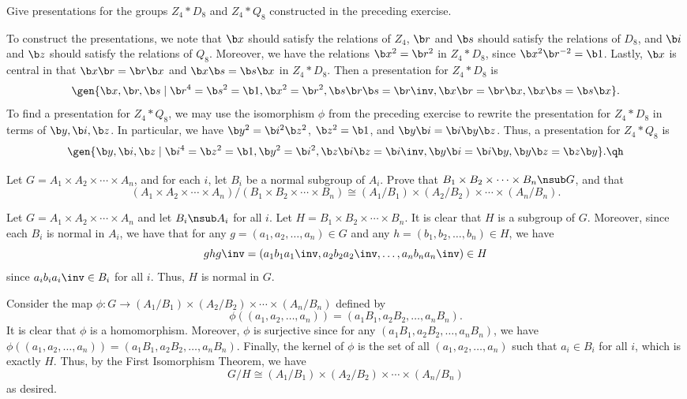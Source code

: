 \begin{exercise}\label{ex5.1.13}
    Give presentations for the groups $Z_4 * D_8$ and $Z_4 * Q_8$ constructed in the preceding exercise.
\end{exercise}

\begin{sol}
    To construct the presentations, we note that $\b x$ should satisfy the relations of $Z_4$, $\b r$ and $\b s$ should satisfy the relations of $D_8$, and $\b i$ and $\b z$ should satisfy the relations of $Q_8$. Moreover, we have the relations $\b x^2 = \b r^2$ in $Z_4 * D_8$, since $\b x^2\b r^{-2} = \b 1$. Lastly, $\b x$ is central in that $\b x \b r = \b r\b x$ and $\b x\b s = \b s\b x$ in $Z_4 * D_8$. Then a presentation for $Z_4 * D_8$ is
    \[\gen{\b x, \b r, \b s \mid \b r^4 = \b s^2 = \b 1, \b x^2 = \b r^2, \b s\b r\b s = \b r\inv, \b x\b r = \b r\b x, \b x\b s = \b s\b x}.\]
    To find a presentation for $Z_4 * Q_8$, we may use the isomorphism $\phi$ from the preceding exercise to rewrite the presentation for $Z_4 * D_8$ in terms of $\b y, \b i, \b z$. In particular, we have $\b y^2 = \b i^2\b z^2$, $\b z^2 = \b 1$, and $\b y\b i = \b i\b y\b z$. Thus, a presentation for $Z_4 * Q_8$ is
    \[\gen{\b y, \b i, \b z \mid \b i^4 = \b z^2 = \b 1, \b y^2 = \b i^2, \b z\b i \b z = \b i\inv, \b y\b i = \b i\b y, \b y\b z = \b z\b y}. \qh\]
\end{sol}

\begin{exercise}\label{ex5.1.14}
    Let $G = A_1 \times A_2 \times \cdots \times A_n$, and for each $i$, let $B_i$ be a normal subgroup of $A_i$. Prove that $B_1 \times B_2 \times \cdots \times B_n \nsub G$, and that
    \[(A_1 \times A_2 \times \cdots \times A_n)/(B_1 \times B_2 \times \cdots \times B_n) \cong (A_1/B_1) \times (A_2/B_2) \times \cdots \times (A_n/B_n).\]
\end{exercise}

\begin{sol}
    Let $G = A_1 \times A_2 \times \cdots \times A_n$ and let $B_i \nsub A_i$ for all $i$. Let $H = B_1 \times B_2 \times \cdots \times B_n$. It is clear that $H$ is a subgroup of $G$. Moreover, since each $B_i$ is normal in $A_i$, we have that for any $g = (a_1, a_2, \ldots, a_n) \in G$ and any $h = (b_1, b_2, \ldots, b_n) \in H$, we have
    \[ghg\inv = (a_1b_1a_1\inv, a_2b_2a_2\inv, \ldots, a_nb_na_n\inv) \in H\]
    since $a_ib_ia_i\inv \in B_i$ for all $i$. Thus, $H$ is normal in $G$.

    Consider the map $\phi : G \to (A_1/B_1) \times (A_2/B_2) \times \cdots \times (A_n/B_n)$ defined by
    \[\phi((a_1, a_2, \ldots, a_n)) = (a_1B_1, a_2B_2, \ldots, a_nB_n).\]
    It is clear that $\phi$ is a homomorphism. Moreover, $\phi$ is surjective since for any $(a_1B_1, a_2B_2, \ldots, a_nB_n)$, we have $\phi((a_1, a_2, \ldots, a_n)) = (a_1B_1, a_2B_2, \ldots, a_nB_n)$. Finally, the kernel of $\phi$ is the set of all $(a_1, a_2, \ldots, a_n)$ such that $a_i \in B_i$ for all $i$, which is exactly $H$. Thus, by the First Isomorphism Theorem, we have
    \[G/H \cong (A_1/B_1) \times (A_2/B_2) \times \cdots \times (A_n/B_n)\]
    as desired.
\end{sol}

